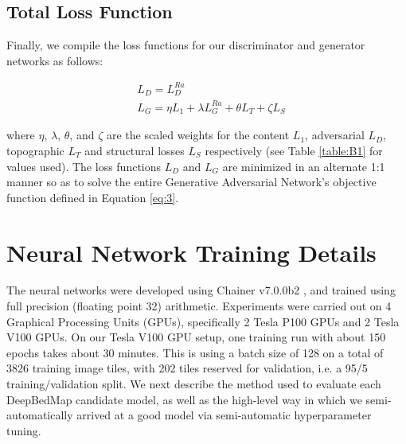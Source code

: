 \documentclass[tc, manuscript]{copernicus}
\begin{document}
\subsection{Total Loss Function}

Finally, we compile the loss functions for our discriminator and generator networks as follows:

\begin{align}
  & L_D = L_D^{Ra} \label{eq:A8}\\
  & L_G = \eta L_1 + \lambda L_G^{Ra} + \theta L_T + \zeta L_S \label{eq:A9}
\end{align}

where $\eta$, $\lambda$, $\theta$, and $\zeta$ are the scaled weights for the content $L_1$, adversarial $L_D$, topographic $L_T$ and structural losses $L_S$ respectively (see Table \ref{table:B1} for values used).
The loss functions $L_D$ and $L_G$ are minimized in an alternate 1:1 manner so as to solve the entire Generative Adversarial Network's objective function defined in Equation \eqref{eq:3}.


\section{Neural Network Training Details} \label{appendix:B}

The neural networks were developed using Chainer v7.0.0b2 \citep{TokuiChainerDeepLearning2019}, and trained using full precision (floating point 32) arithmetic.
Experiments were carried out on 4 Graphical Processing Units (GPUs), specifically 2 Tesla P100 GPUs and 2 Tesla V100 GPUs.
On our Tesla V100 GPU setup, one training run with about 150 epochs takes about 30 minutes.
This is using a batch size of 128 on a total of 3826 training image tiles, with 202 tiles reserved for validation, i.e. a 95/5 training/validation split.
We next describe the method used to evaluate each DeepBedMap candidate model, as well as the high-level way in which we semi-automatically arrived at a good model via semi-automatic hyperparameter tuning.
\end{document}
